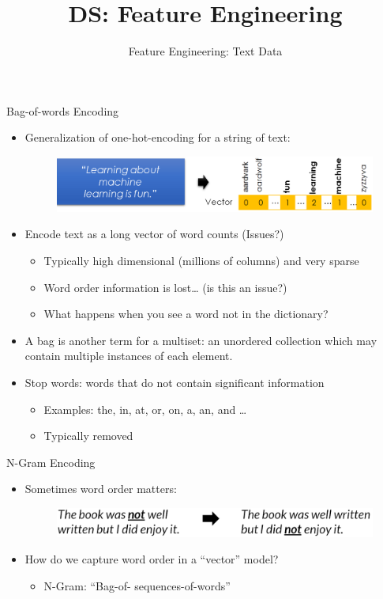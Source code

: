 \documentclass[aspectratio=169]{../latex_main/tntbeamer}  %
\title[Introduction]{DS: Feature Engineering}
\subtitle{Feature Engineering: Text Data}
\begin{document}
	
	\maketitle
	\begin{frame}{Bag-of-words Encoding}
	    \begin{itemize}
	        \item Generalization of one-hot-encoding for a string of text:
	        \begin{figure}
	            \includegraphics[scale=.35]{Bild4}
	        \end{figure}
	        \item Encode text as a long vector of word counts (Issues?)
	        \begin{itemize}
	            \item Typically high dimensional (millions of columns) and very sparse
	            \item Word order information is lost… (is this an issue?)
	            \item What happens when you see a word not in the dictionary?
	        \end{itemize}
	        \item A bag is another term for a multiset: an unordered collection which may contain multiple instances of each element.
	        \item Stop words: words that do not contain significant information
	        \begin{itemize}
	            \item Examples: the, in, at, or, on, a, an, and …
	            \item Typically removed
	        \end{itemize}
	    \end{itemize}
	\end{frame}
	
	
	\begin{frame}{N-Gram Encoding}
	    \begin{itemize}
	        \item Sometimes word order matters:
	        \begin{figure}
	            \includegraphics[scale=.35]{Bild5}
	        \end{figure}
	        \item How do we capture word order in a “vector” model?
	        \begin{itemize}
	            \item N-Gram: “Bag-of- sequences-of-words” 
	        \end{itemize}
	    \end{itemize}
	\end{frame}
	
\end{document}
